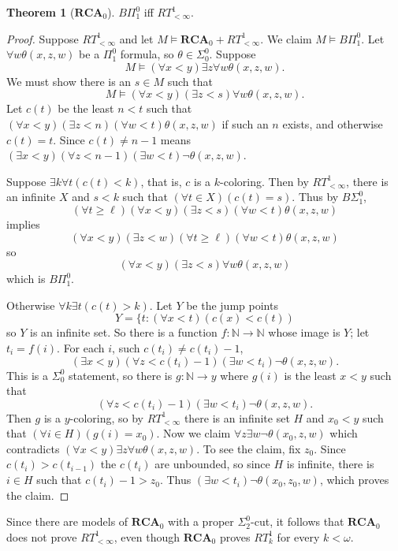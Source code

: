 \documentclass[12pt]{book}
\newcommand{\NN}{\mathbb{N}}
\newcommand{\RCA}{\mathbf{RCA}}
\theoremstyle{definition}
\newtheorem{theorem}{Theorem}[chapter]
\begin{document}
\begin{theorem}[$\RCA_0$]
$B\Pi_1^0$ iff $RT^1_{<\infty}$.
\end{theorem}
\begin{proof}
Suppose $RT_{<\infty}^1$ and let $M \models \RCA_0 + RT_{<\infty}^1$.
We claim $M \models B\Pi_1^0$. Let $\forall w\theta(x, z, w)$ be a $\Pi_1^0$ formula, so $\theta \in \Sigma_0^0$.
Suppose
$$M \models (\forall x < y)\exists z \forall w \theta(x, z, w).$$
We must show there is an $s \in M$ such that
$$M \models (\forall x < y)(\exists z < s)\forall w \theta(x, z, w).$$
Let $c(t)$ be the least $n < t$ such that $(\forall x < y)(\exists z < n)(\forall w < t)\theta(x, z, w)$ if such an $n$ exists, and otherwise $c(t) = t$.
Since $c(t) \neq n - 1$ means $(\exists x < y)(\forall z < n - 1)(\exists w < t)\neg\theta(x, z, w)$.

Suppose $\exists k \forall t(c(t) < k)$, that is, $c$ is a $k$-coloring.
Then by $RT^1_{<\infty}$, there is an infinite $X$ and $s < k$ such that $(\forall t \in X)(c(t) = s)$.
Thus by $B\Sigma_1^0$,
$$(\forall t \geq \ell)(\forall x < y)(\exists z < s)(\forall w < t)\theta(x, z, w)$$
implies
$$(\forall x < y)(\exists z < w)(\forall t \geq \ell)(\forall w < t)\theta(x, z, w)$$
so
$$(\forall x < y)(\exists z < s)\forall w \theta(x, z, w)$$
which is $B\Pi_1^0$.

Otherwise $\forall k \exists t(c(t) > k)$.
Let $Y$ be the jump points
$$Y = \{t: (\forall x < t)(c(x) < c(t))$$
so $Y$ is an infinite set.
So there is a function $f: \NN \to \NN$ whose image is $Y$; let $t_i = f(i)$.
For each $i$, such $c(t_i) \neq c(t_i) - 1$,
$$(\exists x < y)(\forall z < c(t_i) - 1)(\exists w < t_i)\neg \theta(x, z, w).$$
This is a $\Sigma_0^0$ statement, so there is $g: \NN \to y$ where $g(i)$ is the least $x < y$ such that
$$(\forall z < c(t_i) - 1)(\exists w < t_i) \neg \theta(x, z, w).$$
Then $g$ is a $y$-coloring, so by $RT_{<\infty}^1$ there is an infinite set $H$ and $x_0 < y$ such that $(\forall i \in H)(g(i) = x_0)$.
Now we claim $\forall z \exists w \neg \theta(x_0, z, w)$ which contradicts $(\forall x < y) \exists z \forall w \theta(x, z, w)$.
To see the claim, fix $z_0$. Since $c(t_i) > c(t_{i-1})$ the $c(t_i)$ are unbounded, so since $H$ is infinite, there is $i \in H$ such that $c(t_i) - 1 > z_0$.
Thus $(\exists w < t_i) \neg \theta(x_0, z_0, w)$, which proves the claim.
\end{proof}

Since there are models of $\RCA_0$ with a proper $\Sigma_2^0$-cut, it follows that $\RCA_0$ does not prove $RT^1_{<\infty}$, even though $\RCA_0$ proves $RT^1_k$ for every $k < \omega$.
\end{document}
